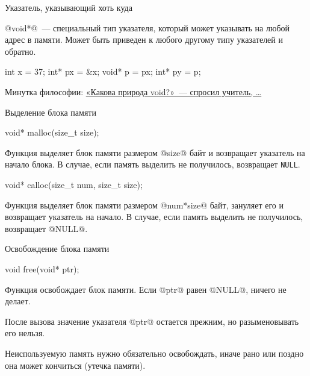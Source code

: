 \begin{frame}[fragile]{Указатель, указывающий хоть куда}

  @void*@~--- специальный тип указателя, который может указывать на любой адрес
  в памяти. Может быть приведен к любого другому типу указателей и обратно.

  \begin{clisting}[escapechar=\!]
    int x = 37;
    int* px = &x;
    void* p = px;
    int* py = p;
  \end{clisting}

  \pause
  Минутка философии: \href{%
    http://thecodelesscode.com/case/5?lang=ru%
  }{%
    «Какова природа void?»~--- спросил учитель, …
  }

\end{frame}

\begin{frame}[fragile]{Выделение блока памяти}

  \begin{clisting}[basicstyle=\ttfamily]
    void* malloc(size_t size);
  \end{clisting}
  \revertListingParskip
  Функция выделяет блок памяти размером @size@ байт и возвращает указатель на
  начало блока. \alert<+>{В случае, если память выделить не получилось,
  возвращает \texttt{NULL}.}

  \onslide<+->
  \begin{clisting}[basicstyle=\ttfamily]
    void* calloc(size_t num, size_t size);
  \end{clisting}
  \revertListingParskip
  Функция выделяет блок памяти размером @num*size@ байт, зануляет его и
  возвращает указатель на начало. В случае, если память выделить не получилось,
  возвращает @NULL@.


\end{frame}

\begin{frame}[fragile]{Освобождение блока памяти}

  \begin{clisting}[basicstyle=\ttfamily]
    void free(void* ptr);
  \end{clisting}

  Функция освобождает блок памяти. Если @ptr@ равен @NULL@, ничего не делает.

  \pause
  После вызова значение указателя @ptr@ остается прежним, но разыменовывать его
  нельзя.

  \pause
  Неиспользуемую память нужно обязательно освобождать, иначе рано или поздно
  она может кончиться (утечка памяти).



\end{frame}

